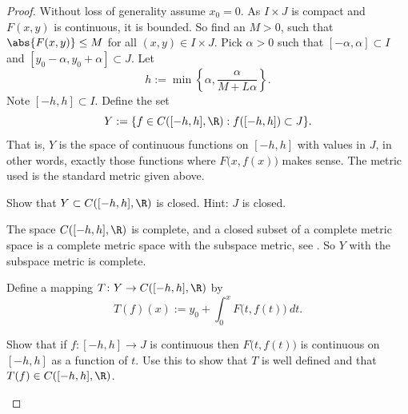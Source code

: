 \documentclass[12pt]{book}
\begin{document}
\begin{proof}
Without loss of generality assume $x_0 =0$.
As $I \times J$ is compact and
$F(x,y)$ is continuous, it is bounded.
So find an $M > 0$, such that
$\abs{F(x,y)} \leq M$ for all $(x,y) \in I\times J$.
Pick $\alpha > 0$ such that
$[-\alpha,\alpha] \subset I$ and $[y_0-\alpha, y_0 + \alpha] \subset J$.
Let
\begin{equation*}
h := \min \left\{ \alpha, \frac{\alpha}{M+L\alpha} \right\} .
\end{equation*}
Note $[-h,h] \subset I$.
Define the set
\begin{equation*}
Y := \{ f \in C([-h,h],\R) : f([-h,h]) \subset J \} . %
\end{equation*}
That is, $Y$ is the space of continuous functions on $[-h,h]$ with values in
$J$, in other words,
exactly those functions where $F\bigl(x,f(x)\bigr)$ makes sense.
The metric used is the standard metric given above.

\begin{exercise}
Show that $Y \subset C([-h,h],\R)$ is closed.
Hint: $J$ is closed.
\end{exercise}

The space $C([-h,h],\R)$ is complete, and
a closed subset of a complete metric space is a complete metric space with
the subspace metric, see .
So $Y$ with the subspace metric is
complete.

Define a mapping
$T \colon Y \to C([-h,h],\R)$ by
\begin{equation*}
T(f)(x)
:=
y_0 + \int_0^x F\bigl(t,f(t)\bigr)~dt .
\end{equation*}

\begin{exercise}
Show that if $f \colon [-h,h] \to J$ is continuous then $F\bigl(t,f(t)\bigr)$
is continuous on $[-h,h]$ as a function of $t$.
Use this to show that
$T$ is well defined and that $T(f) \in C([-h,h],\R)$.
\end{exercise}


\end{proof}
\end{document}

